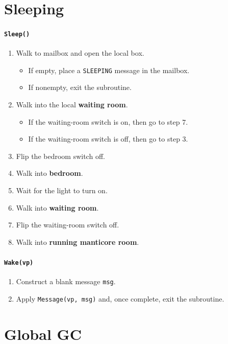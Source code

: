 \documentclass[11pt]{article}
\begin{document}
\section{Sleeping}

\paragraph{\texttt{Sleep()}}
\begin{enumerate}
  \item Walk to mailbox and open the local box.
    \begin{itemize}
      \item If empty, place a \texttt{SLEEPING} message in the mailbox.
      \item If nonempty, exit the subroutine.
    \end{itemize}
  \item Walk into the local \textbf{waiting room}.
    \begin{itemize}
      \item If the waiting-room switch is on, then go to step 7.
      \item If the waiting-room switch is off, then go to step 3.
    \end{itemize}
  \item Flip the bedroom switch off.
  \item Walk into \textbf{bedroom}.
  \item Wait for the light to turn on.
  \item Walk into \textbf{waiting room}.
  \item Flip the waiting-room switch off.
  \item Walk into \textbf{running manticore room}.
\end{enumerate}

\paragraph{\texttt{Wake(vp)}}

\begin{enumerate}
  \item Construct a blank message \texttt{msg}.
  \item Apply \texttt{Message(vp, msg)} and, once complete, exit the subroutine.
\end{enumerate}

\section{Global GC}
\end{document}
